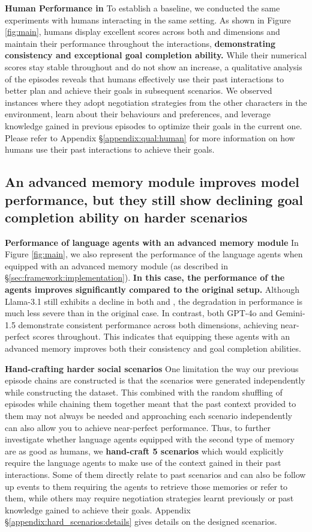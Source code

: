 \textbf{Human Performance in \lifelongsotopia} \quad To establish a baseline, we conducted the same experiments with humans interacting in the same setting. As shown in Figure \ref{fig:main}, humans display excellent scores across both \believability and \goalcompletion dimensions and maintain their performance throughout the interactions, \textbf{demonstrating consistency and exceptional goal completion ability.} While their numerical scores stay stable throughout and do not show an increase, a qualitative analysis of the episodes reveals that humans effectively use their past interactions to better plan and achieve their goals in subsequent scenarios. We observed instances where they adopt negotiation strategies from the other characters in the environment, learn about their behaviours and preferences, and leverage knowledge gained in previous episodes to optimize their goals in the current one. Please refer to Appendix \S \ref{appendix:qual:human} for more information on how humans use their past interactions to achieve their goals.

\subsection{An advanced memory module improves model performance, but they still show declining goal completion ability on harder scenarios}
\label{sec:results:rq3}
\textbf{Performance of language agents with an advanced memory module} \quad In Figure \ref{fig:main}, we also represent the performance of the language agents when equipped with an advanced memory module (as described in \S \ref{sec:framework:implementation}). \textbf{In this case, the performance of the agents improves significantly compared to the original setup.} Although Llama-3.1 still exhibits a decline in both \believability and \goalcompletion, the degradation in performance is much less severe than in the original case. In contrast, both GPT-4o and Gemini-1.5 demonstrate consistent performance across both dimensions, achieving near-perfect scores throughout. This indicates that equipping these agents with an advanced memory improves both their consistency and goal completion abilities.

\textbf{Hand-crafting harder social scenarios} \quad One limitation the way our previous episode chains are constructed is that the scenarios were generated independently while constructing the dataset. This combined with the random shuffling of episodes while chaining them together meant that the past context provided to them may not always be needed and approaching each scenario independently can also allow you to achieve near-perfect performance. Thus, to further investigate whether language agents equipped with the second type of memory are as good as humans, we \textbf{hand-craft 5 scenarios} which would explicitly require the language agents to make use of the context gained in their past interactions. Some of them directly relate to past scenarios and can also be follow up events to them requiring the agents to retrieve those memories or refer to them, while others may require negotiation strategies learnt previously or past knowledge gained to achieve their goals. Appendix \S \ref{appendix:hard_scenarios:details} gives details on the designed scenarios.

